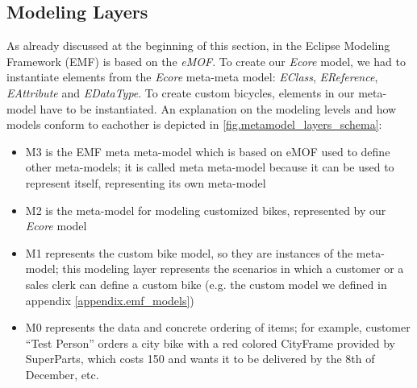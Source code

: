 \subsection{Modeling Layers}
\noindent As already discussed at the beginning of this section, in the Eclipse
Modeling Framework (EMF) is based on the \emph{eMOF}. To create our \emph{Ecore} model,
we had to instantiate elements from the \emph{Ecore} meta-meta model:
\emph{EClass}, \emph{EReference}, \emph{EAttribute} and \emph{EDataType}. To create custom
bicycles, elements in our meta-model have to be instantiated. An explanation on
the modeling levels and how models conform to eachother is depicted in
\ref{fig.metamodel_layers_schema}:
\begin{itemize}
  \item{M3} is the EMF meta meta-model which is based on eMOF used to
  define other meta-models; it is called meta meta-model because it can be used to
  represent itself, representing its own meta-model
  \item{M2} is the meta-model for modeling customized bikes, represented by
  our \emph{Ecore} model
  \item{M1} represents the custom bike model, so they are instances of the
  meta-model; this modeling layer represents the scenarios in which a customer
  or a sales clerk can define a custom bike (e.g. the custom model we defined
  in appendix \ref{appendix.emf_models})
  \item{M0} represents the data and concrete ordering of items; for example,
  customer ``Test Person'' orders a city bike with a red colored CityFrame
  provided by SuperParts, which costs 150 and wants it to be delivered by the
  8th of December, etc.
\end{itemize} 
